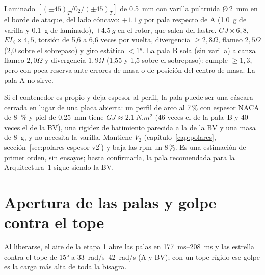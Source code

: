 \begin{resultado}
Laminado $[(\pm45)_T/0_2/(\pm45)_T]$ de \SI{0.5}{mm} con varilla pultruida Ø\,\SI{2}{mm}
en el borde de ataque, del lado cóncavo: $+\SI{1.1}{g}$ por pala respecto de A
(\SI{1.0}{g} de varilla y \SI{0.1}{g} de laminado), $+\SI{4.5}{g}$ en el rotor, que
salen del lastre. $GJ\times6{,}8$, $EI_\beta\times4{,}5$, torsión de 5,6 a 6,6
veces por vuelta, divergencia $\ge2{,}8\Omega$, flameo $2{,}5\Omega$ (2,0 sobre el sobrepaso)
y giro estático $<\ang{1}$. La pala B sola (sin varilla) alcanza flameo $2{,}0\Omega$ y
divergencia $1{,}9\Omega$ (1,55 y 1,5 sobre el sobrepaso): cumple $\ge1{,}3$, pero con poca
reserva ante errores de masa o de posición del centro de masa. La pala A no sirve.
\end{resultado}

\begin{nota}
Si el contenedor es propio y deja espesor al perfil, la pala puede ser una cáscara cerrada en lugar de una placa abierta: un perfil de arco
al 7\,\% con espesor NACA de \SI{8}{\percent} y piel de \SI{0.25}{mm} tiene $GJ\approx\SI{2.1}{N.m^2}$ (46 veces el de la pala~B y 40 veces el de la BV), una
rigidez de batimiento parecida a la de la BV y una masa de \SI{8}{g}, y no necesita la varilla. Mantiene $V_2$ (capítulo~\ref{cap:polares}, sección~\ref{sec:polares-espesor-v2}) y
baja las rpm un 8\,\%. Es una estimación de primer orden, sin ensayos; hasta confirmarla, la pala recomendada para la
Arquitectura~1 sigue siendo la BV.
\end{nota}

\section{Apertura de las palas y golpe contra el tope}\label{sec:estructura-tope}

Al liberarse, el aire de la etapa 1 abre las palas en \SIrange{177}{208}{ms} y las
estrella contra el tope de \ang{+15} a \SIrange{33}{42}{rad/s} (A y BV); con un tope rígido ese
golpe es la carga más alta de toda la bisagra.

